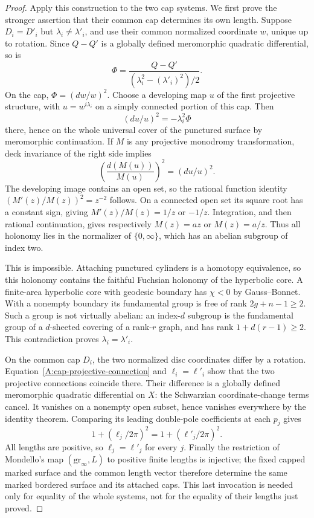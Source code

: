 \begin{proof}
Apply this construction to the two cap systems. We first prove the
stronger assertion that their common cap determines its own length.
Suppose $D_i=D'_i$ but $\lambda_i\ne\lambda'_i$, and use their
common normalized coordinate $w$, unique up to rotation. Since
$Q-Q'$ is a globally defined meromorphic quadratic differential,
so is
\[
 \Phi=\frac{Q-Q'}{(\lambda_i^2-(\lambda'_i)^2)/2}.
\]
On the cap, $\Phi=(dw/w)^2$. Choose a developing map $u$ of the
first projective structure, with $u=w^{i\lambda_i}$ on a simply
connected portion of this cap. Then
\[
 (du/u)^2=-\lambda_i^2\Phi
\]
there, hence on the whole universal cover of the punctured surface
by meromorphic continuation. If $M$ is any projective monodromy
transformation, deck invariance of the right side implies
\[
 \left(\frac{d(M(u))}{M(u)}\right)^2=(du/u)^2.
\]
The developing image contains an open set, so the rational function
identity $(M'(z)/M(z))^2=z^{-2}$ follows. On a connected open set
its square root has a constant sign, giving
$M'(z)/M(z)=1/z$ or $-1/z$. Integration, and then rational
continuation, gives respectively $M(z)=az$ or $M(z)=a/z$.
Thus all holonomy lies in the normalizer of $\{0,\infty\}$,
which has an abelian subgroup of index two.

This is impossible. Attaching punctured cylinders is a homotopy
equivalence, so this holonomy contains the faithful Fuchsian
holonomy of the hyperbolic core. A finite-area hyperbolic core with
geodesic boundary has $\chi<0$ by Gauss--Bonnet. With a nonempty
boundary its fundamental group is free of rank
$2g+n-1\ge2$. Such a group is not virtually abelian: an index-$d$
subgroup is the fundamental group of a $d$-sheeted covering of a
rank-$r$ graph, and has rank $1+d(r-1)\ge2$. This contradiction
proves $\lambda_i=\lambda'_i$.

On the common cap $D_i$, the two normalized disc coordinates differ
by a rotation.
Equation~\eqref{A:cap-projective-connection} and
$\ell_i=\ell'_i$ show that the two projective connections coincide
there. Their difference is a globally defined meromorphic quadratic
differential on $X$: the Schwarzian coordinate-change terms cancel.
It vanishes on a nonempty open subset, hence vanishes everywhere by
the identity theorem. Comparing its leading double-pole coefficients
at each $p_j$ gives
\[
 1+(\ell_j/2\pi)^2=1+(\ell'_j/2\pi)^2.
\]
All lengths are positive, so $\ell_j=\ell'_j$ for every $j$.
Finally the restriction of Mondello's map
$(\mathrm{gr}_\infty,L)$ to positive finite lengths is injective;
the fixed capped marked surface and the common length vector therefore
determine the same marked bordered surface and its attached caps.
This last invocation is needed only for equality of the whole systems,
not for the equality of their lengths just proved.
\end{proof}

